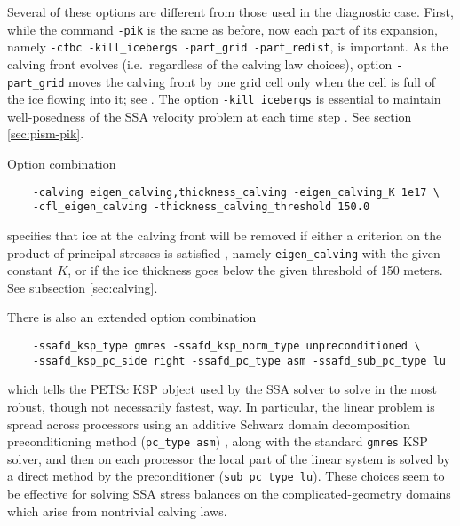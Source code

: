 Several of these options are different from those used in the diagnostic case.  First, while the command \texttt{-pik} is the same as before, now each part of its expansion, namely \texttt{-cfbc -kill_icebergs -part_grid -part_redist}, is important.  As the calving front evolves (i.e.~regardless of the calving law choices), option \texttt{-part_grid} moves the calving front by one grid cell only when the cell is full of the ice flowing into it; see \cite{Albrechtetal2011}.  The option \texttt{-kill_icebergs} is essential to maintain well-posedness of the SSA velocity problem at each time step \cite{Winkelmannetal2011}.  See section \ref{sec:pism-pik}.

Option combination
\begin{verbatim}
    -calving eigen_calving,thickness_calving -eigen_calving_K 1e17 \
    -cfl_eigen_calving -thickness_calving_threshold 150.0
\end{verbatim}
specifies that ice at the calving front will be removed if either a criterion on the product of principal stresses is satisfied \cite{Levermannetal2012}, namely \texttt{eigen_calving} with the given constant $K$, or if the ice thickness goes below the given threshold of 150 meters.  See subsection \ref{sec:calving}.

There is also an extended option combination
\begin{verbatim}
    -ssafd_ksp_type gmres -ssafd_ksp_norm_type unpreconditioned \
    -ssafd_ksp_pc_side right -ssafd_pc_type asm -ssafd_sub_pc_type lu
\end{verbatim}
which tells the PETSc KSP object used by the SSA solver to solve in the most robust, though not necessarily fastest, way.  In particular, the linear problem is spread across processors using an additive Schwarz domain decomposition preconditioning method (\texttt{pc_type asm}) \cite{Smithetal1996}, along with the standard \texttt{gmres} KSP solver, and then on each processor the local part of the linear system is solved by a direct method by the preconditioner (\texttt{sub_pc_type lu}).  These choices seem to be effective for solving SSA stress balances on the complicated-geometry domains which arise from nontrivial calving laws.



